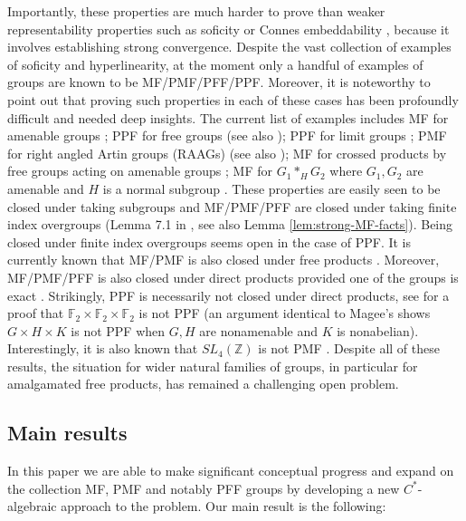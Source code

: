 \documentclass[10pt]{amsart}
\theoremstyle{definition}
\begin{document}
Importantly, these properties are much harder to prove than weaker representability properties such as soficity or Connes embeddability \cite{pestov2008hyperlinear}, because it involves establishing {strong convergence}. Despite the vast collection of examples of soficity and hyperlinearity, at the moment only a handful of examples of groups are known to be MF/PMF/PFF/PPF. Moreover, it is noteworthy to point out that proving such properties in each of these cases has been profoundly difficult and needed deep insights. The current list of examples includes MF for amenable groups \cite{TWW2017}; PPF for free groups \cite{BordenaveCollins2019} (see also \cite{HaagerupThorbjornsen2005, Chen_2026}); PPF for limit groups \cite{loudermagee2025limitgroups}; PMF for right angled Artin groups (RAAGs) \cite{MageeThomas2023} (see also \cite{chen2024newapproachstrongconvergence}); MF for crossed products by free groups acting on amenable groups \cite{RainoneSchafhauser2019}; MF for $G_1*_HG_2$ where $G_1,G_2$ are amenable and $H$ is a normal subgroup \cite{schafhauser2024finite}. These properties are easily seen to be closed under taking subgroups and MF/PMF/PFF are closed under taking finite index overgroups (Lemma 7.1 in \cite{loudermagee2025limitgroups}, see also Lemma \ref{lem:strong-MF-facts}). Being closed under finite index overgroups seems open in the case of PPF. It is currently known that MF/PMF is also closed under free products \cite{collins2014strong, hayes2015lp}. Moreover, MF/PMF/PFF is also closed under direct products provided one of the groups is exact \cite{HadwinShen2010}. Strikingly, PPF is necessarily not closed under direct products, see \cite{magee2025strong} for a proof that $\mathbb{F}_2\times \mathbb{F}_2 \times \mathbb{F}_2$ is not PPF (an argument identical to Magee's shows $G\times H\times K$ is not PPF when $G,H$ are nonamenable and $K$ is nonabelian). Interestingly, it is also known that $SL_4(\mathbb{Z})$ is not PMF \cite{Magee_2024}. Despite all of these results, the situation for wider natural families of groups, in particular for amalgamated free products, has remained a challenging open problem. 

\subsection{Main results} In this paper we are able to make significant conceptual progress and expand on the collection MF, PMF and notably PFF groups by developing a new $C^*$-algebraic approach to the problem. Our main result is the following: 
\end{document}

